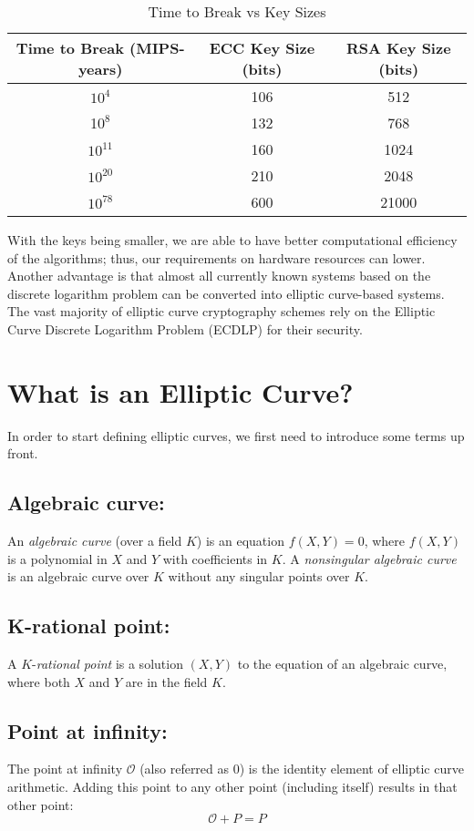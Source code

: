 \documentclass[bp,en]{FEIstyle}
\begin{document}
\begin{table}[h]
    \centering
    \caption{Time to Break vs Key Sizes}
    \begin{tabular}{|c|c|c|}
        \hline
        \textbf{Time to Break (MIPS-years)} & \textbf{ECC Key Size (bits)} & \textbf{RSA Key Size (bits)} \\
        \hline
        $10^4$  & 106   & 512  \\ \hline
        1$0^8$  & 132   & 768  \\ \hline
        $10^{11}$    & 160   & 1024   \\ \hline
        $10^{20}$    & 210   & 2048   \\ \hline
        $10^{78}$    & 600   & 21000  \\
        \hline
    \end{tabular}
\end{table}


With the keys being smaller, we are able to have better computational efficiency of the algorithms; thus, our requirements on hardware resources can lower. Another advantage is that almost all currently known systems based on the discrete logarithm problem can be converted into elliptic curve-based systems. The vast majority of elliptic curve cryptography schemes rely on the Elliptic Curve Discrete Logarithm Problem (ECDLP) for their security.
\section*{What is an Elliptic Curve?}
In order to start defining elliptic curves, we first need to introduce some terms up front.
\subsection*{Algebraic curve:}
An \textit{algebraic curve} (over a field $K$) is an equation $f(X,Y)=0$, where $f(X,Y)$ is a polynomial in $X$ and $Y$ with coefficients in $K$. A \textit{nonsingular algebraic curve} is an algebraic curve over $K$ without any singular points over $K$.
\subsection*{K-rational point:}
A $K$-\textit{rational point} is a solution $(X,Y)$ to the equation of an algebraic curve, where both $X$ and $Y$ are in the field $K$.
\subsection*{Point at infinity:}
The point at infinity $\mathcal{O}$ (also referred as 0) is the identity element of elliptic curve arithmetic. Adding this point to any other point (including itself) results in that other point:
\[
\mathcal{O} + P = P 
\]
\end{document}
